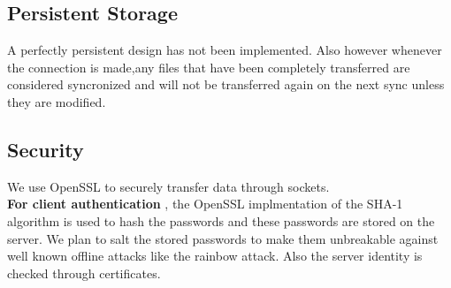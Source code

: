 \documentclass[11pt,fleqn]{book} %
\begin{document}
\subsection{Persistent Storage}
A perfectly persistent design has not been implemented. Also however whenever the connection is made,any files that have been completely transferred are considered syncronized and will not be transferred again on the next sync unless they are modified.

\subsection{Security}
We use OpenSSL to securely transfer data through sockets.
\\ \textbf{For client authentication} , the OpenSSL implmentation of the SHA-1 algorithm is used to hash the passwords and these passwords are stored on the server. We plan to salt the stored passwords to make them unbreakable against well known offline attacks like the rainbow attack. Also the server identity is checked through certificates.
\end{document}
